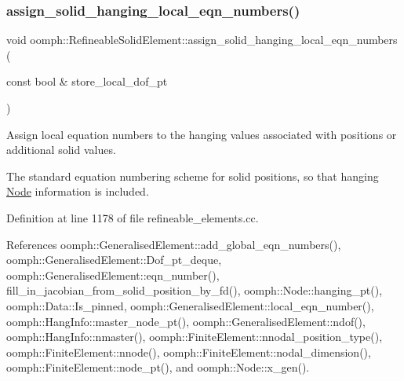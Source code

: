 \subsubsection{\texorpdfstring{assign\+\_\+solid\+\_\+hanging\+\_\+local\+\_\+eqn\+\_\+numbers()}{assign\_solid\_hanging\_local\_eqn\_numbers()}}
{\footnotesize\ttfamily void oomph\+::\+Refineable\+Solid\+Element\+::assign\+\_\+solid\+\_\+hanging\+\_\+local\+\_\+eqn\+\_\+numbers (\begin{DoxyParamCaption}\item[{const bool \&}]{store\+\_\+local\+\_\+dof\+\_\+pt }\end{DoxyParamCaption})\hspace{0.3cm}{\ttfamily [private]}}



Assign local equation numbers to the hanging values associated with positions or additional solid values. 

The standard equation numbering scheme for solid positions, so that hanging \hyperlink{classoomph_1_1Node}{Node} information is included. 

Definition at line 1178 of file refineable\+\_\+elements.\+cc.



References oomph\+::\+Generalised\+Element\+::add\+\_\+global\+\_\+eqn\+\_\+numbers(), oomph\+::\+Generalised\+Element\+::\+Dof\+\_\+pt\+\_\+deque, oomph\+::\+Generalised\+Element\+::eqn\+\_\+number(), fill\+\_\+in\+\_\+jacobian\+\_\+from\+\_\+solid\+\_\+position\+\_\+by\+\_\+fd(), oomph\+::\+Node\+::hanging\+\_\+pt(), oomph\+::\+Data\+::\+Is\+\_\+pinned, oomph\+::\+Generalised\+Element\+::local\+\_\+eqn\+\_\+number(), oomph\+::\+Hang\+Info\+::master\+\_\+node\+\_\+pt(), oomph\+::\+Generalised\+Element\+::ndof(), oomph\+::\+Hang\+Info\+::nmaster(), oomph\+::\+Finite\+Element\+::nnodal\+\_\+position\+\_\+type(), oomph\+::\+Finite\+Element\+::nnode(), oomph\+::\+Finite\+Element\+::nodal\+\_\+dimension(), oomph\+::\+Finite\+Element\+::node\+\_\+pt(), and oomph\+::\+Node\+::x\+\_\+gen().

\mbox{\label{classoomph_1_1RefineableSolidElement_a7718105cbc38cff969a246b093b6ecee}} 

